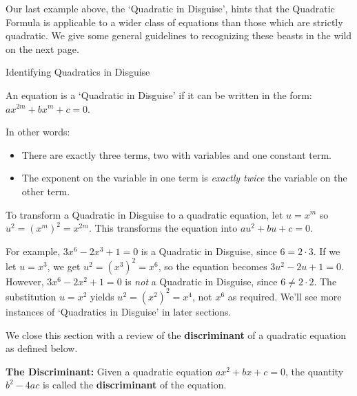 Our last example above, the `Quadratic in Disguise', hints that the Quadratic Formula is applicable to a wider class of equations than those which are strictly quadratic.  We give some general guidelines to recognizing these beasts in the wild on the next page.

\begin{floatbox}{Identifying Quadratics in Disguise}
\label{QuadinDisguise}

An equation is a `Quadratic in Disguise' if it can be written in the form:  $ax^{2m} + bx^{m} + c = 0$.  

In other words:

\begin{itemize}

\item There are exactly three terms, two with variables and one constant term.

\item  The exponent on the variable in one term is \textit{exactly twice} the variable on the other term.

\end{itemize}

To transform a Quadratic in Disguise to a quadratic equation, let $u = x^m$ so $u^2 = (x^m)^2 = x^{2m}$. This transforms the equation into $au^2 + bu + c = 0$.

\end{floatbox}

For example, $3x^6 - 2x^3 + 1 = 0$ is a Quadratic in Disguise, since $6 = 2 \cdot 3$.  If we let $u = x^3$, we get $u^2 = (x^3)^2 = x^6$, so the equation becomes $3u^2 - 2u + 1 = 0$.  However, $3x^6 - 2x^2 + 1 = 0$ is \textit{not} a Quadratic in Disguise, since $6 \neq 2\cdot 2$. The substitution $u = x^2$ yields $u^2 = (x^2)^2 = x^4$, not $x^6$ as required.  We'll see more instances of `Quadratics in Disguise' in later sections.

We close this section with a review of the \textbf{discriminant} of a quadratic equation as defined below.

\begin{tcolorbox}
    
\begin{defn} \textbf{The Discriminant:} Given a quadratic equation $ax^2 + bx + c = 0$, the quantity $b^2 - 4ac$ is called the \textbf{discriminant} of the equation.

\end{defn}

\end{tcolorbox}

